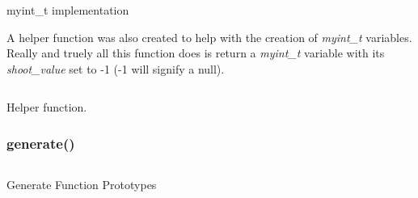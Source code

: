 \documentclass[a4paper, 12pt, titlepage]{article}
\newenvironment{code}{\captionsetup{type=listing}}{}
\newcommand{\sourcecode}[3]{
    \begin{code}
      \inputminted[linenos,numbersep=5pt,gobble=0,frame=lines,framesep=2mm,]{c}{#1}
        \caption{#2}
        \label{lst: #3}
    \end{code}
}
\begin{document}
\begin{onehalfspacing}
\sourcecode{snippets/myint_t.c}{myint\_t implementation}{myint_t}

A helper function was also created to help with the creation of \emph{myint\_t} variables. Really and truely all this function does is return a \emph{myint\_t} variable with its \emph{shoot\_value} set to -1 (-1 will signify a null).

\sourcecode{snippets/myint_t_create_t.c}{Helper function.}{create_t}

  \subsubsection{generate()}
    \sourcecode{snippets/generate_header.c}{Generate Function Prototypes}{generate_header}

\end{onehalfspacing}
\end{document}
